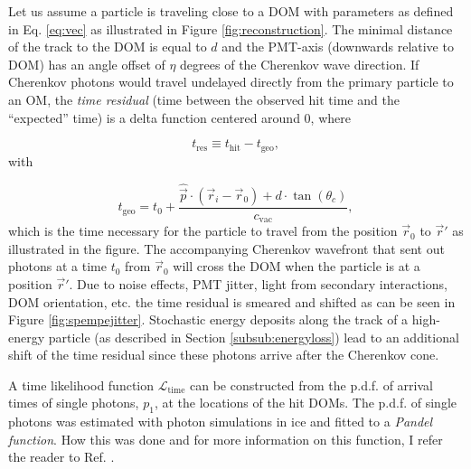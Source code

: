 Let us assume a particle is traveling close to a DOM with parameters as defined in Eq. \ref{eq:vec} as illustrated in Figure \ref{fig:reconstruction}. The minimal distance of the track to the DOM is equal to $d$ and the PMT-axis (downwards relative to DOM) has an angle offset of $\eta$ degrees of the Cherenkov wave direction. If Cherenkov photons would travel undelayed directly from the primary particle to an OM, the \textit{time residual} (time between the observed hit time and the ``expected'' time) is a delta function centered around 0, where

\begin{equation}
t_{\textrm{res}} \equiv t_{\textrm{hit}} - t_{\textrm{geo}},
\end{equation}
\noindent with

\begin{equation}
t_\textrm{geo} = t_0 + \frac{\hat{\vec{p}} \cdot (\vec{r}_i - \vec{r}_0) + d\cdot \tan (\theta_c)}{c_\textrm{vac}},
\end{equation}
\noindent which is the time necessary for the particle to travel from the position $\vec{r}_0$ to $\vec{r}'$ as illustrated in the figure. The accompanying Cherenkov wavefront that sent out photons at a time $t_0$ from $\vec{r}_0$ will cross the DOM when the particle is at a position $\vec{r}'$. Due to noise effects, PMT jitter, light from secondary interactions, DOM orientation, etc. the time residual is smeared and shifted as can be seen in Figure \ref{fig:spempejitter}. Stochastic energy deposits along the track of a high-energy particle (as described in Section \ref{subsub:energyloss}) lead to an additional shift of the time residual since these photons arrive after the Cherenkov cone.

A time likelihood function $\mathcal{L}_\textrm{time}$ can be constructed from the p.d.f. of arrival times of single photons, $p_1$, at the locations of the hit DOMs. The p.d.f. of single photons was estimated with photon simulations in ice and fitted to a \textit{Pandel function}. How this was done and for more information on this function, I refer the reader to Ref. \cite{Ahrens:2003fg}. 

